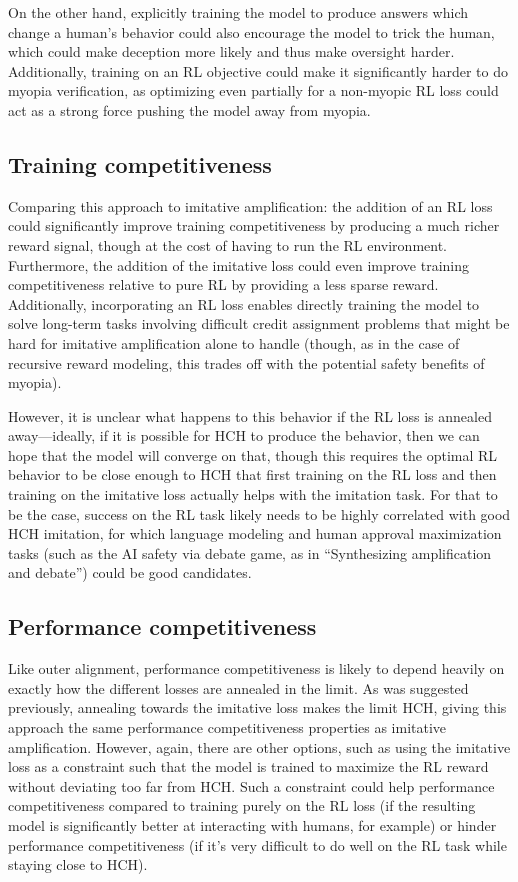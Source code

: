 \documentclass[
  onecolumn,
  natbib,
]{miri-tech-article}
\begin{document}
On the other hand, explicitly training the model to produce answers which change a human's behavior could also encourage the model to trick the human, which could make deception more likely and thus make oversight harder. Additionally, training on an RL objective could make it significantly harder to do myopia verification, as optimizing even partially for a non-myopic RL loss could act as a strong force pushing the model away from myopia.

\subsection{Training competitiveness} Comparing this approach to imitative amplification: the addition of an RL loss could significantly improve training competitiveness by producing a much richer reward signal, though at the cost of having to run the RL environment. Furthermore, the addition of the imitative loss could even improve training competitiveness relative to pure RL by providing a less sparse reward. Additionally, incorporating an RL loss enables directly training the model to solve long-term tasks involving difficult credit assignment problems that might be hard for imitative amplification alone to handle (though, as in the case of recursive reward modeling, this trades off with the potential safety benefits of myopia).

However, it is unclear what happens to this behavior if the RL loss is annealed away---ideally, if it is possible for HCH to produce the behavior, then we can hope that the model will converge on that, though this requires the optimal RL behavior to be close enough to HCH that first training on the RL loss and then training on the imitative loss actually helps with the imitation task. For that to be the case, success on the RL task likely needs to be highly correlated with good HCH imitation, for which language modeling and human approval maximization tasks (such as the AI safety via debate game, as in ``Synthesizing amplification and debate'') could be good candidates.\cite{synthesizing}

\subsection{Performance competitiveness} Like outer alignment, performance competitiveness is likely to depend heavily on exactly how the different losses are annealed in the limit. As was suggested previously, annealing towards the imitative loss makes the limit HCH, giving this approach the same performance competitiveness properties as imitative amplification. However, again, there are other options, such as using the imitative loss as a constraint such that the model is trained to maximize the RL reward without deviating too far from HCH. Such a constraint could help performance competitiveness compared to training purely on the RL loss (if the resulting model is significantly better at interacting with humans, for example) or hinder performance competitiveness (if it's very difficult to do well on the RL task while staying close to HCH).
\end{document}
